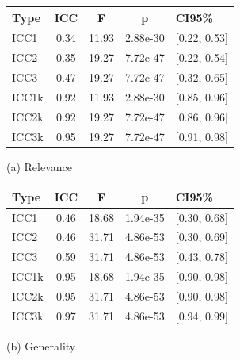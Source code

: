 \begin{figure}[h]
    \centering
    \begin{minipage}{.5\textwidth}
        \centering
        \begin{tabular}{lcccl}
            \hline
            \textbf{Type} & \textbf{ICC} & \textbf{F} & \textbf{p} & \textbf{CI95\%} \\
            \hline
            ICC1          & 0.34         & 11.93      & 2.88e-30   & [0.22, 0.53]    \\
            ICC2          & 0.35         & 19.27      & 7.72e-47   & [0.22, 0.54]    \\
            ICC3          & 0.47         & 19.27      & 7.72e-47   & [0.32, 0.65]    \\
            ICC1k         & 0.92         & 11.93      & 2.88e-30   & [0.85, 0.96]    \\
            ICC2k         & 0.92         & 19.27      & 7.72e-47   & [0.86, 0.96]    \\
            ICC3k         & 0.95         & 19.27      & 7.72e-47   & [0.91, 0.98]    \\
            \hline
        \end{tabular}
        \caption*{(a) Relevance}
    \end{minipage}%
    \begin{minipage}{.5\textwidth}
        \centering
        \begin{tabular}{lcccl}
            \hline
            \textbf{Type} & \textbf{ICC} & \textbf{F} & \textbf{p} & \textbf{CI95\%} \\
            \hline
            ICC1          & 0.46         & 18.68      & 1.94e-35   & [0.30, 0.68]    \\
            ICC2          & 0.46         & 31.71      & 4.86e-53   & [0.30, 0.69]    \\
            ICC3          & 0.59         & 31.71      & 4.86e-53   & [0.43, 0.78]    \\
            ICC1k         & 0.95         & 18.68      & 1.94e-35   & [0.90, 0.98]    \\
            ICC2k         & 0.95         & 31.71      & 4.86e-53   & [0.90, 0.98]    \\
            ICC3k         & 0.97         & 31.71      & 4.86e-53   & [0.94, 0.99]    \\
            \hline
        \end{tabular}
        \caption*{(b) Generality}
    \end{minipage}


\end{figure}
